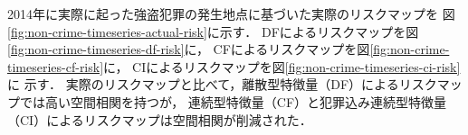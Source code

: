 



2014年に実際に起った強盗犯罪の発生地点に基づいた実際のリスクマップを
図\ref{fig:non-crime-timeseries-actual-risk}に示す．
DFによるリスクマップを図\ref{fig:non-crime-timeseries-df-risk}に，
CFによるリスクマップを図\ref{fig:non-crime-timeseries-cf-risk}に，
CIによるリスクマップを図\ref{fig:non-crime-timeseries-ci-risk}に
示す．
実際のリスクマップと比べて，離散型特徴量（DF）によるリスクマップでは高い空間相関を持つが，
連続型特徴量（CF）と犯罪込み連続型特徴量（CI）によるリスクマップは空間相関が削減された．









